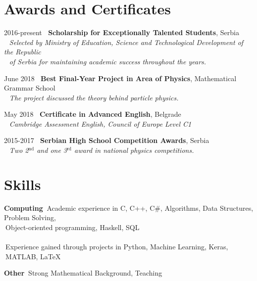 \documentclass[10pt]{article}
\begin{document}
\section{Awards and Certificates}

\tabbedblock
{
2016-present \> $\:$ \textbf{Scholarship for Exceptionally Talented Students}, Serbia\\[2pt]
\>\+
$\:$ $\:$\textit{Selected by Ministry of Education, Science and Technological Development of the Republic} \\
$\:$ $\:$\textit{of Serbia for maintaining academic success throughout the years.}
}


\tabbedblock
{
June 2018 \> $\:$ \textbf{Best Final-Year Project in Area of Physics}, Mathematical Grammar School\\[2pt]
\>\+
$\:$ $\:$\textit{The project discussed the theory behind particle physics.}
}

\tabbedblock
{
May 2018 \> $\:$ \textbf{Certificate in Advanced English}, Belgrade \\[2pt]
\>\+
$\:$ $\:$\textit{Cambridge Assessment English, Council of Europe Level C1}
}

\tabbedblock
{
2015-2017 \> $\:$ \textbf{Serbian High School Competition Awards}, Serbia\\[2pt]
\>\+
$\:$ $\:$\textit{Two 2$^\text{nd}$ and one 3$^\text{rd}$ award in national physics competitions.}
}



\section{Skills}



\tabbedblock
{
\textbf{Computing}
\>\+
$\:$Academic experience in C, C++, C\#, Algorithms, Data Structures, Problem Solving,\\
$\:$Object-oriented programming, Haskell, SQL
\\ \\
$\:$Experience gained through projects in Python, Machine Learning, Keras, \\
$\:$MATLAB, \LaTeX\
}






\tabbedblock
{
\textbf{Other } \> $\:$Strong Mathematical Background, Teaching
}
\end{document}
